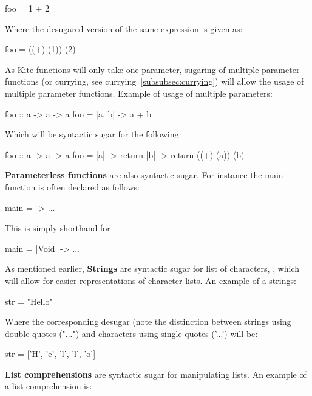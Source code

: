 \begin{kite}
foo = 1 + 2
\end{kite}

Where the desugared version of the same expression is given as:

\begin{kite}
foo = ((+) (1)) (2)
\end{kite}

As Kite functions will only take one parameter, sugaring of multiple parameter functions (or currying, see currying~\ref{subsubsec:currying}) will allow the usage of multiple parameter functions. Example of usage of multiple parameters:

\begin{kite}
foo :: a -> a -> a
foo = |a, b| -> {
  a + b
}
\end{kite}

Which will be syntactic sugar for the following:

\begin{kite}
foo :: a -> a -> a
foo = |a| -> {
  return |b| -> {
    return ((+) (a)) (b)
  }
}
\end{kite}

\textbf{Parameterless functions} are also syntactic sugar. For instance the main function is often declared as follows:

\begin{kite}
main = -> {
  ...
}
\end{kite}

This is simply shorthand for

\begin{kite}
main = |Void| -> {
  ...
}
\end{kite}

As mentioned earlier, \textbf{Strings} are syntactic sugar for list of characters, , which will allow for easier representations of character lists. An example of a strings:

\begin{kite}
str = "Hello"
\end{kite}

Where the corresponding desugar (note the distinction between strings using double-quotes ("...") and characters using single-quotes ('...') will be:

\begin{kite}
str = ['H', 'e', 'l', 'l', 'o']
\end{kite}

\label{sec:ex-listcomp}
\textbf{List comprehensions} are syntactic sugar for manipulating lists. An example of a list comprehension is:

